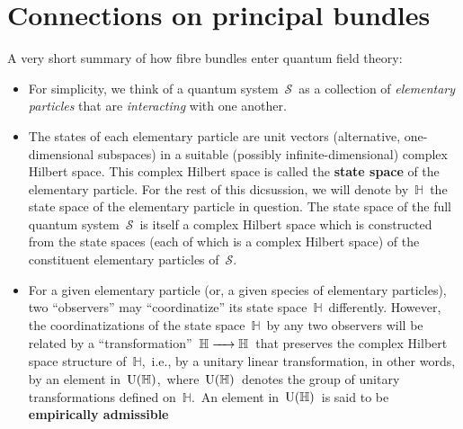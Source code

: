 

\chapter{Connections on principal bundles}
\setcounter{theorem}{0}
\setcounter{equation}{0}


\renewcommand{\theenumi}{\roman{enumi}}
\renewcommand{\labelenumi}{\textnormal{(\theenumi)}$\;\;$}


A very short summary of how fibre bundles enter quantum field theory:
\begin{itemize}
\item
	For simplicity, we think of a quantum system \,$\mathcal{S}$\,
	as a collection of \textit{elementary particles}
	that are \textit{interacting} with one another.
\item
	The states of each elementary particle
	are unit vectors (alternative, one-dimensional subspaces)
	in a suitable (possibly infinite-dimensional) complex Hilbert space.
	This complex Hilbert space is called the \textbf{state space} of the elementary particle.
	For the rest of this dicsussion, we will denote by \,$\mathbb{H}$\,
	the state space of the elementary particle in question.
	\vskip -0.01cm
	\noindent
	The state space of the full quantum system \,$\mathcal{S}$\, is itself
	a complex Hilbert space which is constructed from the state spaces
	(each of which is a complex Hilbert space)
	of the constituent elementary particles of \,$\mathcal{S}$.\,
\item
	For a given elementary particle (or, a given species of elementary particles),
	two ``observers'' may ``coordinatize'' its state space \,$\mathbb{H}$\, differently.
	However, the coordinatizations of the state space \,$\mathbb{H}$\, by any two observers
	will be related by a ``transformation''
	\,$\mathbb{H} \xrightarrow{{\color{white}222}} \mathbb{H}$\,
	that preserves the complex Hilbert space structure of \,$\mathbb{H}$,\,
	i.e., by a unitary linear transformation,
	in other words, by an element in \,$\textnormal{U}(\mathbb{H})$,\,
	where \,$\textnormal{U}(\mathbb{H})$\, denotes the group of unitary transformations
	defined on \,$\mathbb{H}$.\,
	\vskip -0.01cm
	\noindent
	An element in \,$\textnormal{U}(\mathbb{H})$\, is said to be \textbf{empirically admissible}

\end{itemize}
